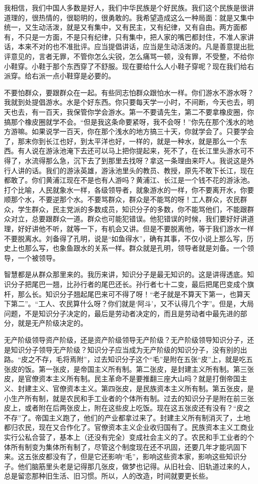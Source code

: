 我相信，我们中国人多数是好人，我们中华民族是个好民族。我们这个民族是很讲道理的，很热情的，很聪明的，很勇敢的。我希望造成这么一种局面：就是又集中统一，又生动活泼，就是又有集中，又有民主，又有纪律，又有自由。两方面都有，不只是一方面，不是只有纪律，只有集中，把人家的嘴巴都封住，不准人家讲话，本来不对的也不准批评。应当提倡讲话，应当是生动活泼的。凡是善意提出批评意见的，言者无罪，不管你怎么尖锐，怎么痛骂一顿，没有罪，不受整，不给你小鞋穿。小鞋于那个东西穿了不舒服。现在要给什么人小鞋子穿呢？现在我们给右派穿。给右派一点小鞋穿是必要的。

不要怕群众，要跟群众在一起。有些同志怕群众跟怕水一样。你们游水不游水呀？我就到处提倡游水。水是个好东西。你只要每天学一小时，不间断，今天也去，明天也去，有一百天，我保管你学会游水。第一不要请先生，第二不要拿橡皮圈，你搞那个橡皮圈就学不会。“但是我这条命要紧呀，我不会呀！”你先在那个浅水的地方游嘛。如果说学一百天，你在那个浅水的地方搞三十天，你就学会了。只要学会了，那末你到长江也好，到太平洋也好，一样的，就是一种水，就是那么一个东西。有人说在游泳池淹下去还可以马上把你提起来，死不了，在长江里头游水可不得了，水流得那么急，沉下去了到那里去找呀？拿这一条理由来吓人。我说这是外行人讲的话。我们的游泳英雄，游泳池里头的教员、教授，原先不敢下长江，现在都敢了。你们黄浦江现在不是也有人游吗？黄浦江、长江是一个钱不花的游泳池。打个比喻，人民就象水一样，各级领导者，就象游水的一样，你不要离开水，你要顺那个水，不要逆那个水。不要骂群众，群众是不能骂的呀！工人群众，农民群众，学生群众，民主党派的多数成员，知识分子的多数，你不能骂他们，不能跟群众对立，总要跟群众一道。群众也可能犯错误。他犯错误的时候，我们要好好讲道理，好好讲他不听，就等一下，有机会又讲。但是不要脱离他，等于我们游水一样不要脱离水。刘备得了孔明，说是“如鱼得水”，确有其事，不仅小说上那么写，历史上也那么写，也象鱼跟水的关系一样。群众就是孔明，领导者就是刘备。一个领导，一个被领导。

智慧都是从群众那里来的。我历来讲，知识分子是最无知识的。这是讲得透底。知识分子把尾巴一翘，比孙行者的尾巴还长。孙行者七十二变，最后把尾巴变成个旗杆，那么长。知识分子翘起尾巴来可不得了呀！“老子就是不算天下第一，也算天下第二”。“工人、农民算什么呀？你们就是‘阿斗’，又不认得几个字”。但是，大局问题，不是知识分子决定的，最后是劳动者决定的，而且是劳动者中最先进的部分，就是无产阶级决定的。

无产阶级领导资产阶级，还是资产阶级领导无产阶级？无产阶级领导知识分子，还是知识分子领导无产阶级？知识分子应当成为无产阶级的知识分子，没有别的出路。“皮之不存，毛将焉附”，过去知识分子这个“毛”是附在五张“皮”上，就是吃五张皮的饭。第一张皮，是帝国主义所有制。第二张皮，是封建主义所有制。第三张皮，是官僚资本主义所有制。民主革命不是要推翻三座大山吗？就是打倒帝国主义、封建主义、官僚资本主义。第四张皮，是民族资本主义所有制。第五张皮，是小生产所有制，就是农民和手工业者的个体所有制。过去的知识分子是附在前三张皮上，或者附在后两张皮上，附在这些皮上吃饭。现在这五张皮还有没有？“皮之不存”了。帝国主义跑了，他们的产业都拿过来了。封建主义所有制消灭了，土地都归农民，现在又合作化了。官僚资本主义企业收归国有了。民族资本主义工商业实行公私合营了，基本上（还没有完全）变成社会主义的了。农民和手工业者的个体所有制变为集体所有制了，尽管这个制度现在还不巩固，还要几年才能巩固下来。这五张皮都没有了，但是它还影响“毛”，影响这些资本家，影响这些知识分子。他们脑筋里头老是记得那几张皮，做梦也记得。从旧社会、旧轨道过来的人，总是留恋那种旧生活、旧习惯。所以，人的改造，时间就要更长些。

